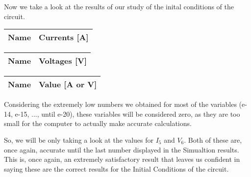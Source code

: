 Now we take a look at the results of our study of the inital conditions of the circuit.

  \begin{tabular}{|l|r|}
    \hline    
    {\bf Name} & {\bf Currents [A]} \\ \hline
    
  \end{tabular}
\quad
  \begin{tabular}{|l|r|}
    \hline    
    {\bf Name} & {\bf Voltages [V]} \\ \hline
    
  \end{tabular}
\quad
\begin{tabular}{|l|r|}
    \hline    
    {\bf Name} & {\bf Value [A or V]} \\ \hline
    
  \end{tabular}

Considering the extremely low numbers we obtained for most of the variables (e-14, e-15, ..., until e-20), these variables will be considered zero, as they are too small for the computer to actually make accurate calculations.

So, we will be only taking a look at the values for $I_5$ and $V_6$. Both of these are, once again, accurate until the last number displayed in the Simualtion results. This is, once again, an extremely satisfactory result that leaves us confident in saying these are the correct results for the Initial Conditions of the circuit.